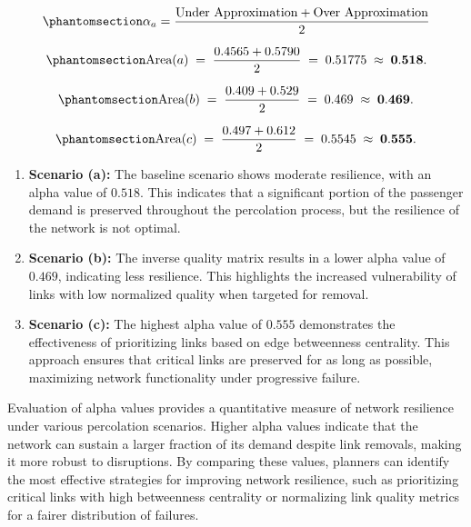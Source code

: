 \documentclass[
  letterpaper,
  DIV=11,
  numbers=noendperiod]{scrartcl}
\providecommand{\tightlist}{%
  \setlength{\itemsep}{0pt}\setlength{\parskip}{0pt}}\usepackage{longtable,booktabs,array}
\begin{document}
\begin{equation}\phantomsection\label{eq-alpha}{
\alpha_a = \frac{\text{Under Approximation} + \text{Over Approximation}}{2}
}\end{equation}

\begin{equation}\phantomsection\label{eq-alpha-a}{
\text{Area}(a) \;=\; \frac{0.4565 + 0.5790}{2} \;=\; 0.51775 \;\approx\; \mathbf{0.518}.
}\end{equation}

\begin{equation}\phantomsection\label{eq-alpha-b}{
\text{Area}(b) \;=\; \frac{0.409 + 0.529}{2} \;=\; 0.469 \;\approx\; \mathbf{0.469}.
}\end{equation}

\begin{equation}\phantomsection\label{eq-alpha-c}{
\text{Area}(c) \;=\; \frac{0.497 + 0.612}{2} \;=\; 0.5545 \;\approx\; \mathbf{0.555}.
}\end{equation}

\begin{enumerate}
\def\labelenumi{\arabic{enumi}.}
\tightlist
\item
  \textbf{Scenario (a):} The baseline scenario shows moderate
  resilience, with an alpha value of \(0.518\). This indicates that a
  significant portion of the passenger demand is preserved throughout
  the percolation process, but the resilience of the network is not
  optimal.
\item
  \textbf{Scenario (b):} The inverse quality matrix results in a lower
  alpha value of \(0.469\), indicating less resilience. This highlights
  the increased vulnerability of links with low normalized quality when
  targeted for removal.
\item
  \textbf{Scenario (c):} The highest alpha value of \(0.555\)
  demonstrates the effectiveness of prioritizing links based on edge
  betweenness centrality. This approach ensures that critical links are
  preserved for as long as possible, maximizing network functionality
  under progressive failure.
\end{enumerate}

Evaluation of alpha values provides a quantitative measure of network
resilience under various percolation scenarios. Higher alpha values
indicate that the network can sustain a larger fraction of its demand
despite link removals, making it more robust to disruptions. By
comparing these values, planners can identify the most effective
strategies for improving network resilience, such as prioritizing
critical links with high betweenness centrality or normalizing link
quality metrics for a fairer distribution of failures.
\end{document}

